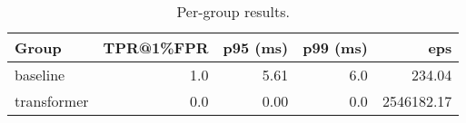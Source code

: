 \begin{table}
\centering
\caption{Per-group results.}
\label{tab:pergroup}
\begin{tabular}{lrrrr}
\toprule
      Group &  TPR@1\%FPR &  p95 (ms) &  p99 (ms) &        eps \\
\midrule
   baseline &        1.0 &      5.61 &       6.0 &     234.04 \\
transformer &        0.0 &      0.00 &       0.0 & 2546182.17 \\
\bottomrule
\end{tabular}
\end{table}
